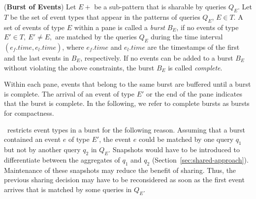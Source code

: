 

\begin{definition}(\textbf{Burst of Events})
%
Let $E+$ be a sub-pattern that is sharable by queries $Q_E$.
Let $T$ be the set of event types that appear in the patterns of queries $Q_E$, $E \in T$. 
%
A set of events of type $E$ within a pane is called a \textit{burst} $B_E$, if no events of type $E' \in T,\ E' \neq E,$ are matched by the queries $Q_E$ during the time interval $(e_\mathit{f}.time, e_l.time)$, where $e_\mathit{f}.time$ and $e_l.time$ are the time\-stamps of the first and the last events in $B_E$, respectively.
%
If no events can be added to a burst $B_E$ without violating the above constraints, the burst $B_E$ is called \textit{complete}.
\label{def:burst}
\end{definition}

Within each pane, events that belong to the same burst are buffered until a burst is complete. The arrival of an event of type $E'$ or the end of the pane indicates that the burst is complete. In the following, we refer to complete bursts as bursts for compactness.

\app\ restricts event types in a burst for the following reason. Assuming that a burst contained an event $e$ of type $E'$, the event $e$ could be matched by one query $q_1$ but not by another query $q_2$ in $Q_E$. Snapshots would have to be introduced to differentiate between the aggregates of $q_1$ and $q_2$ (Section~\ref{sec:shared-approach}). Maintenance of these snapshots may reduce the benefit of sharing. Thus, the previous sharing decision may have to be reconsidered as soon as the first event arrives that is matched  by some queries in $Q_E$. 


